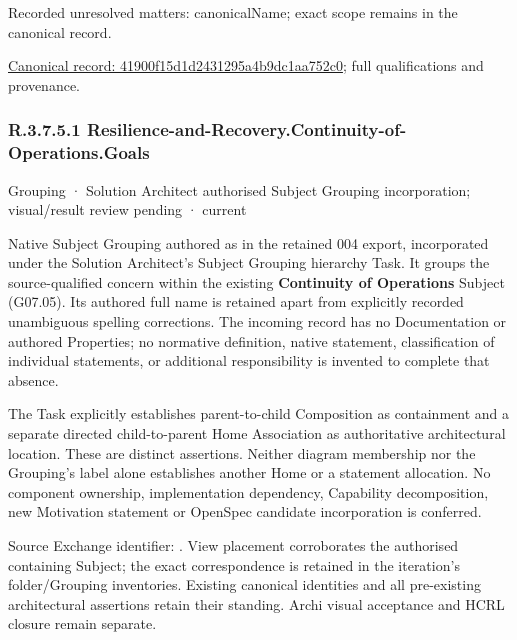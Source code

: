 {\small Recorded unresolved matters: canonicalName; exact scope remains in the canonical record.}\par
{\footnotesize \href{../../../../continuum/grouping/41900f15d1d2431295a4b9dc1aa752c0.md}{Canonical record: 41900f15d1d2431295a4b9dc1aa752c0}; full qualifications and provenance.}\par
\subsubsection*{R.3.7.5.1 Resilience-and-Recovery.Continuity-of-Operations.Goals}
\label{navigation:R.3.7.5.1}

\label{element:a4fbf334ea6e48028e39eb7f74ced2bb}
{\small Grouping · Solution Architect authorised Subject Grouping incorporation; visual/result review pending · current}\par

Native Subject Grouping authored as \texttt{} in the retained 004 export,
incorporated under the Solution Architect's Subject Grouping hierarchy Task.
It groups the source-qualified \texttt{} concern within
the existing \textbf{Continuity of Operations} Subject (G07.05). Its authored full name
is retained apart from explicitly recorded unambiguous spelling corrections.
The incoming record has no Documentation or authored Properties; no normative
definition, native statement, classification of individual statements, or
additional responsibility is invented to complete that absence.



The Task explicitly establishes parent-to-child Composition as containment and
a separate directed child-to-parent Home Association as authoritative architectural
location. These are distinct assertions. Neither diagram membership nor the
Grouping's label alone establishes another Home or a statement allocation.
No component ownership, implementation dependency, Capability decomposition,
new Motivation statement or OpenSpec candidate incorporation is conferred.



Source Exchange identifier: \texttt{}. View placement corroborates
the authorised containing Subject; the exact correspondence is retained in the
iteration's folder/Grouping inventories. Existing canonical identities and all
pre-existing architectural assertions retain their standing. Archi visual
acceptance and HCRL closure remain separate.


